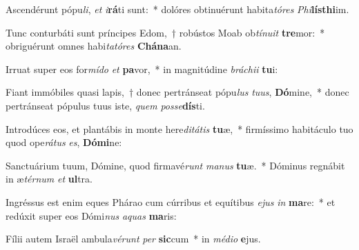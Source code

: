 \item Ascendérunt pópu\textit{li}, \textit{et} \textit{i}\textbf{rá}ti sunt:~* dolóres obtinuérunt habita\textit{tó}\textit{res} \textit{Phi}\textbf{lís}\textbf{thi}im.
\item Tunc conturbáti sunt príncipes Edom,~† robústos Moab ob\textit{tí}\textit{nu}\textit{it} \textbf{tre}mor:~* obriguérunt omnes habi\textit{ta}\textit{tó}\textit{res} \textbf{Chá}\textbf{na}an.
\item Irruat super eos for\textit{mí}\textit{do} \textit{et} \textbf{pa}vor,~* in magnitúdine \textit{brá}\textit{chi}\textit{i} \textbf{tu}i:
\item Fiant immóbiles quasi lapis,~† donec pertránseat pópu\textit{lus} \textit{tu}\textit{us}, \textbf{Dó}mine,~* donec pertránseat pópulus tuus iste, \textit{quem} \textit{pos}\textit{se}\textbf{dís}ti.
\item Introdúces eos, et plantábis in monte here\textit{di}\textit{tá}\textit{tis} \textbf{tu}æ,~* firmíssimo habitáculo tuo quod ope\textit{rá}\textit{tus} \textit{es}, \textbf{Dó}\textbf{mi}ne:
\item Sanctuárium tuum, Dómine, quod firmavé\textit{runt} \textit{ma}\textit{nus} \textbf{tu}æ.~* Dóminus regnábit in æ\textit{tér}\textit{num} \textit{et} \textbf{ul}tra.
\item Ingréssus est enim eques Phárao cum cúrribus et equítibus \textit{e}\textit{jus} \textit{in} \textbf{ma}re:~* et redúxit super eos Dómi\textit{nus} \textit{a}\textit{quas} \textbf{ma}ris:
\item Fílii autem Israël ambula\textit{vé}\textit{runt} \textit{per} \textbf{sic}cum~* in \textit{mé}\textit{di}\textit{o} \textbf{e}jus.
